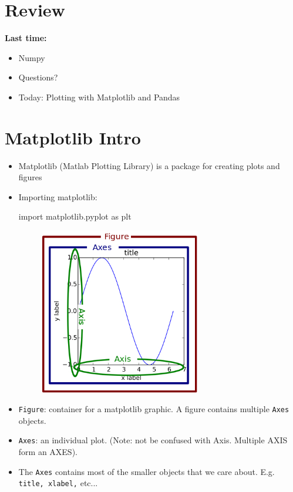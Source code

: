 \documentclass[12pt]{article}
\numberwithin{equation}{section}
\begin{document}
\section{Review}

\textbf{Last time:}
\begin{itemize}
    \item Numpy
    \item Questions?
    \item Today: Plotting with Matplotlib and Pandas 
\end{itemize}

\section{Matplotlib Intro}
\begin{itemize}

    \item Matplotlib (Matlab Plotting Library) is a package for creating plots and figures
    \item Importing matplotlib:
    \begin{python}
    import matplotlib.pyplot as plt
    \end{python}
    \begin{figure}[H]
	    \centering
	    \includegraphics[width=7cm] {fig}
    \end{figure}
    \item \verb|Figure|: container for a matplotlib graphic. A figure contains multiple \verb|Axes| objects.
    \item \verb|Axes|: an individual plot. (Note: not be confused with Axis. Multiple AXIS form an AXES).
    \item The \verb|Axes| contains most of the smaller objects that we care about. E.g. \verb|title, xlabel,| etc...
\end{itemize}
\end{document}

